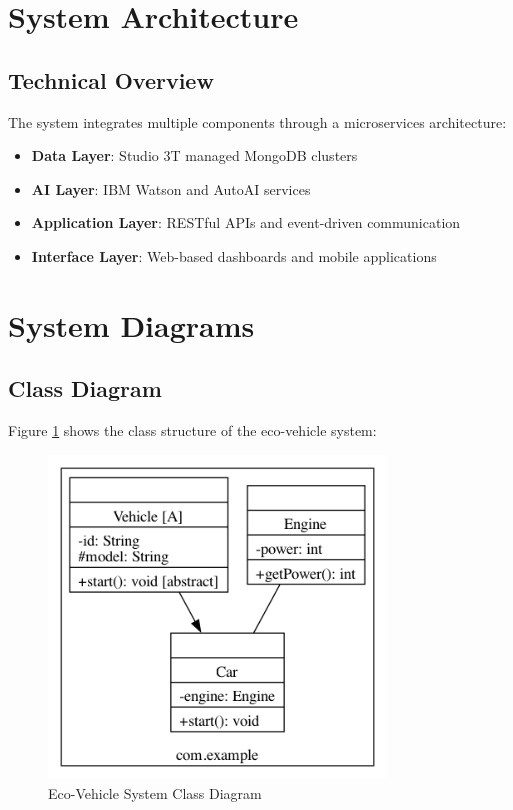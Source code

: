 \documentclass[12pt,a4paper]{article}
\begin{document}
\section{System Architecture}
\subsection{Technical Overview}
The system integrates multiple components through a microservices architecture:
\begin{itemize}
    \item \textbf{Data Layer}: Studio 3T managed MongoDB clusters
    \item \textbf{AI Layer}: IBM Watson and AutoAI services
    \item \textbf{Application Layer}: RESTful APIs and event-driven communication
    \item \textbf{Interface Layer}: Web-based dashboards and mobile applications
\end{itemize}

\section{System Diagrams}
\subsection{Class Diagram}
Figure \ref{fig:class_diagram} shows the class structure of the eco-vehicle system:

\begin{figure}[h]
    \centering
    \includegraphics[width=0.8\textwidth]{example_class_diagram}
    \caption{Eco-Vehicle System Class Diagram}
    \label{fig:class_diagram}
\end{figure}
\end{document}
